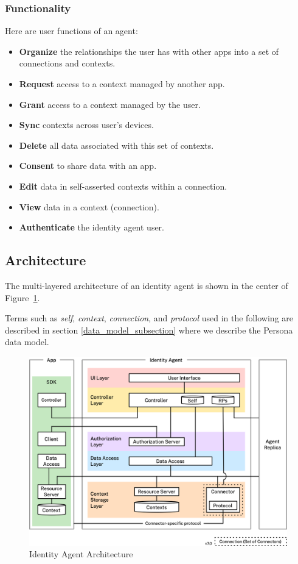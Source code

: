 \documentclass[11pt, oneside]{article}   	%
\begin{document}
\subsubsection{Functionality}

Here are user functions of an agent:

\begin{itemize}
\item \textbf{Organize} the relationships the user has with other apps into a set of connections and contexts.
\item \textbf{Request} access to a context managed by another app.
\item \textbf{Grant} access to a context managed by the user.
\item \textbf{Sync} contexts across user's devices.
\item \textbf{Delete} all data associated with this set of contexts.
\item \textbf{Consent} to share data with an app.
\item \textbf{Edit} data in self-asserted contexts within a connection.
\item \textbf{View} data in a context (connection).
\item \textbf{Authenticate} the identity agent user.
\end{itemize}

\subsection{Architecture}

The multi-layered architecture of an identity agent is shown in the center of Figure~\ref{fig:architecture}. 

Terms such as \emph{self}, \emph{context}, \emph{connection}, and \emph{protocol} used in the following are described in section \ref{data_model_subsection} where we describe the Persona data model.

\begin{figure}[htbp]
\includegraphics[width=\textwidth]{./images/architecture.png}
\caption{Identity Agent Architecture}
\label{fig:architecture}
\end{figure}
\end{document}

